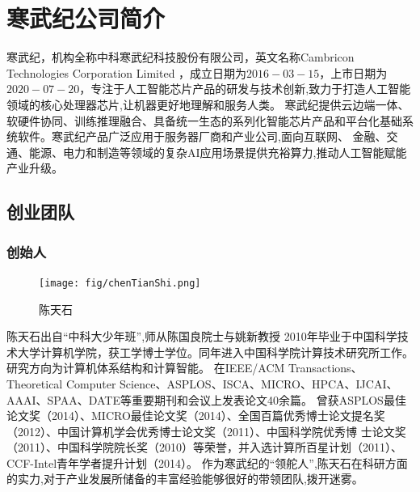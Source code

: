 
\section{寒武纪公司简介}
\quad \quad 寒武纪，机构全称中科寒武纪科技股份有限公司，英文名称Cambricon Technologies Corporation Limited
，成立日期为$2016-03-15$，上市日期为$2020-07-20$，专注于人工智能芯片产品的研发与技术创新,致力于打造人工智能领域的核心处理器芯片,让机器更好地理解和服务人类。
寒武纪提供云边端一体、软硬件协同、训练推理融合、具备统一生态的系列化智能芯片产品和平台化基础系统软件。寒武纪产品广泛应用于服务器厂商和产业公司,面向互联网、
金融、交通、能源、电力和制造等领域的复杂AI应用场景提供充裕算力,推动人工智能赋能产业升级。

\subsection{创业团队}

\subsubsection{创始人}
\begin{figure}%
    \centering
    \texttt{[image: fig/chenTianShi.png]}
    \caption{\footnotesize 陈天石}
    \end{figure}
    陈天石出自“中科大少年班”,师从陈国良院士与姚新教授
    2010年毕业于中国科学技术大学计算机学院，获工学博士学位。同年进入中国科学院计算技术研究所工作。研究方向为计算机体系结构和计算智能。
    在IEEE/ACM Transactions、Theoretical Computer Science、ASPLOS、ISCA、MICRO、HPCA、IJCAI、AAAI、SPAA、DATE等重要期刊和会议上发表论文40余篇。
    曾获ASPLOS最佳论文奖（2014）、MICRO最佳论文奖（2014）、全国百篇优秀博士论文提名奖（2012）、中国计算机学会优秀博士论文奖（2011）、中国科学院优秀博
    士论文奖（2011）、中国科学院院长奖（2010）等荣誉，并入选计算所百星计划（2011）、CCF-Intel青年学者提升计划（2014）。
    作为寒武纪的“领舵人”,陈天石在科研方面的实力,对于产业发展所储备的丰富经验能够很好的带领团队,拨开迷雾。

